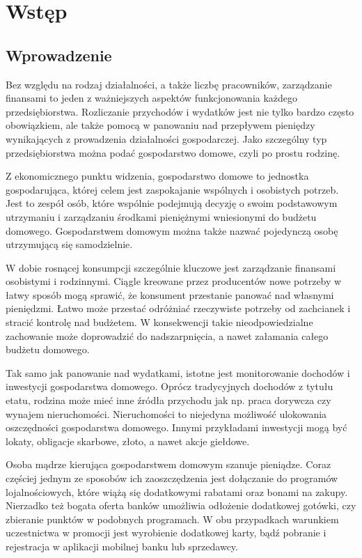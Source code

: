 \chapter{Wstęp}
\section{Wprowadzenie}
Bez względu na rodzaj działalności, a także liczbę pracowników, zarządzanie finansami to jeden z ważniejszych aspektów funkcjonowania każdego przedsiębiorstwa. Rozliczanie przychodów i wydatków jest nie tylko bardzo często obowiązkiem, ale także pomocą w panowaniu nad przepływem pieniędzy wynikających z prowadzenia działalności gospodarczej. Jako szczególny typ przedsiębiorstwa można podać gospodarstwo domowe, czyli po prostu rodzinę.

Z ekonomicznego punktu widzenia, gospodarstwo domowe to jednostka gospodarująca, której celem jest zaspokajanie wspólnych i osobistych potrzeb. Jest to zespół osób, które wspólnie podejmują decyzję o swoim podstawowym utrzymaniu i zarządzaniu środkami pieniężnymi wniesionymi do budżetu domowego. Gospodarstwem domowym można także nazwać pojedynczą osobę utrzymującą się samodzielnie.

W dobie rosnącej konsumpcji szczególnie kluczowe jest zarządzanie finansami osobistymi i rodzinnymi. Ciągle kreowane przez producentów nowe potrzeby w łatwy sposób mogą sprawić, że konsument przestanie panować nad własnymi pieniędzmi. Łatwo może przestać odróżniać rzeczywiste potrzeby od zachcianek i stracić kontrolę nad budżetem. W konsekwencji takie nieodpowiedzialne zachowanie może doprowadzić do nadszarpnięcia, a nawet załamania całego budżetu domowego.

Tak samo jak panowanie nad wydatkami, istotne jest monitorowanie dochodów i inwestycji gospodarstwa domowego. Oprócz tradycyjnych dochodów z tytułu etatu, rodzina może mieć inne źródła przychodu jak np. praca dorywcza czy wynajem nieruchomości. Nieruchomości to niejedyna możliwość ulokowania oszczędności gospodarstwa domowego. Innymi przykładami inwestycji mogą być lokaty, obligacje skarbowe, złoto, a nawet akcje giełdowe.

Osoba mądrze kierująca gospodarstwem domowym szanuje pieniądze. Coraz częściej jednym ze sposobów ich zaoszczędzenia jest dołączanie do programów lojalnościowych, które wiążą się dodatkowymi rabatami oraz bonami na zakupy. Nierzadko też bogata oferta banków umożliwia odłożenie dodatkowej gotówki, czy zbieranie punktów w podobnych programach. W obu przypadkach warunkiem uczestnictwa w promocji jest wyrobienie dodatkowej karty, bądź pobranie i rejestracja w aplikacji mobilnej banku lub sprzedawcy.

